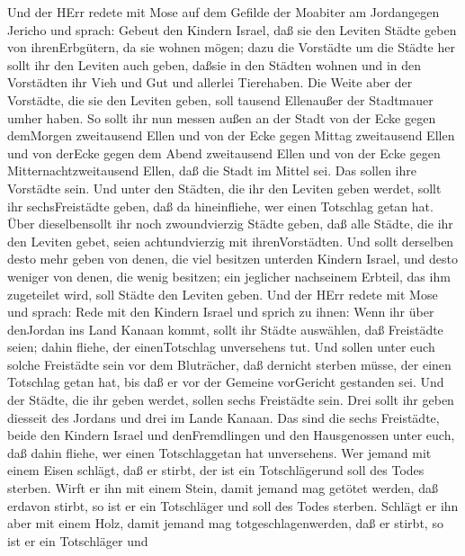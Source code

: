  Und der HErr redete mit Mose auf dem Gefilde der Moabiter
am Jordangegen Jericho und sprach:  Gebeut den Kindern
Israel, daß sie den Leviten Städte geben von ihrenErbgütern, da sie
wohnen mögen;  dazu die Vorstädte um die Städte her sollt
ihr den Leviten auch geben, daßsie in den Städten wohnen und in den
Vorstädten ihr Vieh und Gut und allerlei Tierehaben.  Die
Weite aber der Vorstädte, die sie den Leviten geben, soll tausend
Ellenaußer der Stadtmauer umher haben.  So sollt ihr nun
messen außen an der Stadt von der Ecke gegen demMorgen zweitausend Ellen
und von der Ecke gegen Mittag zweitausend Ellen und von derEcke gegen
dem Abend zweitausend Ellen und von der Ecke gegen
Mitternachtzweitausend Ellen, daß die Stadt im Mittel sei. Das sollen
ihre Vorstädte sein.  Und unter den Städten, die ihr den
Leviten geben werdet, sollt ihr sechsFreistädte geben, daß da
hineinfliehe, wer einen Totschlag getan hat. Über dieselbensollt ihr
noch zwoundvierzig Städte geben,  daß alle Städte, die ihr
den Leviten gebet, seien achtundvierzig mit ihrenVorstädten.
 Und sollt derselben desto mehr geben von denen, die viel
besitzen unterden Kindern Israel, und desto weniger von denen, die wenig
besitzen; ein jeglicher nachseinem Erbteil, das ihm zugeteilet wird,
soll Städte den Leviten geben.  Und der HErr redete mit Mose
und sprach:  Rede mit den Kindern Israel und sprich zu
ihnen: Wenn ihr über denJordan ins Land Kanaan kommt, 
sollt ihr Städte auswählen, daß Freistädte seien; dahin fliehe, der
einenTotschlag unversehens tut.  Und sollen unter euch
solche Freistädte sein vor dem Bluträcher, daß dernicht sterben müsse,
der einen Totschlag getan hat, bis daß er vor der Gemeine vorGericht
gestanden sei.  Und der Städte, die ihr geben werdet,
sollen sechs Freistädte sein.  Drei sollt ihr geben
diesseit des Jordans und drei im Lande Kanaan.  Das sind
die sechs Freistädte, beide den Kindern Israel und denFremdlingen und
den Hausgenossen unter euch, daß dahin fliehe, wer einen Totschlaggetan
hat unversehens.  Wer jemand mit einem Eisen schlägt, daß
er stirbt, der ist ein Totschlägerund soll des Todes sterben.
 Wirft er ihn mit einem Stein, damit jemand mag getötet
werden, daß erdavon stirbt, so ist er ein Totschläger und soll des Todes
sterben.  Schlägt er ihn aber mit einem Holz, damit jemand
mag totgeschlagenwerden, daß er stirbt, so ist er ein Totschläger und
